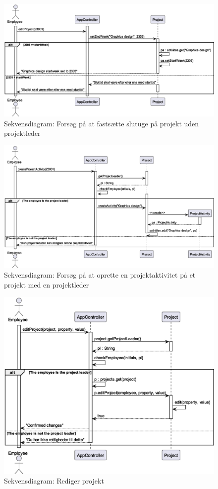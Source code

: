 \begin{figure}[H]
    \centering
    \caption{Sekvensdiagram: Forsøg på at fastsætte slutuge på projekt uden projektleder}\label{fig:sequence_create_PA_no_PL_4}
    \includegraphics[width = .9\textwidth]{Diagrams/createActivityNoPLCase4.eps}
\end{figure}
\begin{figure}[H]
    \centering
    \caption{Sekvensdiagram: Forsøg på at oprette en projektaktivitet på et projekt med en projektleder}\label{fig:sequence_create_PA_PL}
    \includegraphics[width = .95\textwidth]{Diagrams/createActivityPL.eps}
\end{figure}
\begin{figure}[H]
    \centering
    \caption{Sekvensdiagram: Rediger projekt}\label{fig:sequence_project_edit}
    \includegraphics[width = .75\textwidth]{Diagrams/seq_project_edit.eps}
\end{figure}
